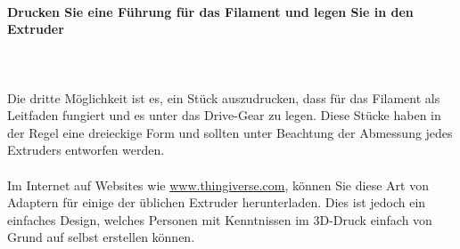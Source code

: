 \documentclass[11pt,a4paper]{article}
\begin{document}
			\paragraph{Drucken Sie eine Führung für das Filament und legen Sie in den Extruder}\mbox{}\\\\
Die dritte Möglichkeit ist es, ein Stück auszudrucken, dass für das Filament als Leitfaden fungiert und es unter das Drive-Gear zu legen. Diese Stücke haben in der Regel eine dreieckige Form und sollten unter Beachtung der Abmessung jedes Extruders entworfen werden.
\\\\
Im Internet auf Websites wie \url{www.thingiverse.com}, können Sie diese Art von Adaptern für einige der üblichen Extruder herunterladen. Dies ist jedoch ein einfaches Design, welches Personen mit Kenntnissen im 3D-Druck einfach von Grund auf selbst erstellen können.
\end{document}
